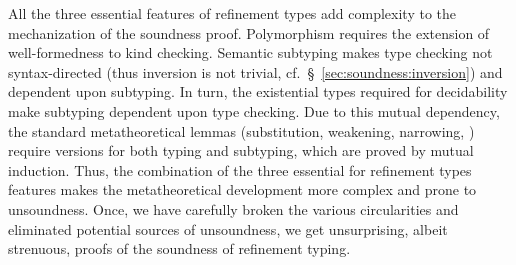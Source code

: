 %
All the three essential features of refinement types add complexity 
to the mechanization of the soundness proof.
Polymorphism requires the extension of well-formedness to kind checking.
%
Semantic subtyping makes type checking not syntax-directed
(thus inversion is not trivial, cf.~\S~\ref{sec:soundness:inversion}) and dependent upon subtyping.
%
In turn, the existential types required for decidability make subtyping dependent upon type checking.
%
Due to this mutual dependency, the standard metatheoretical lemmas (substitution, weakening, narrowing, \etc)
require versions for both typing and subtyping, which are proved by mutual induction.
Thus, the combination of the three essential for refinement types features
makes the metatheoretical development more complex and prone to unsoundness.
%
Once, we have carefully broken the various circularities
and eliminated potential sources of unsoundness, we get
unsurprising, albeit strenuous, proofs of the soundness
of refinement typing.
